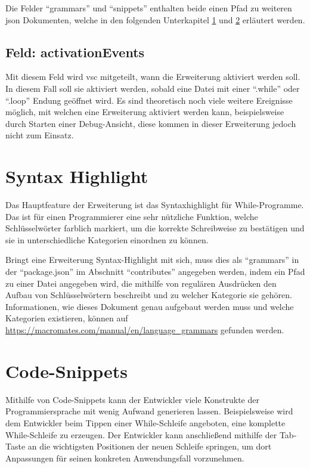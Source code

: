 Die Felder \enquote{grammars} und \enquote{snippets} enthalten beide einen Pfad zu weiteren \ac{json} Dokumenten, welche in den folgenden Unterkapitel \ref{sec:SyntaxHighlight} und \ref{sec:code-snippet} erläutert werden.


\subsection{Feld: activationEvents}
Mit diesem Feld wird \ac{vsc} mitgeteilt, wann die Erweiterung aktiviert werden soll. In diesem Fall soll sie aktiviert werden, sobald eine Datei mit einer \enquote{.while} oder \enquote{.loop} Endung geöffnet wird. Es sind theoretisch noch viele weitere Ereignisse möglich, mit welchen eine Erweiterung aktiviert werden kann, beispielsweise durch Starten einer Debug-Ansicht, diese kommen in dieser Erweiterung jedoch nicht zum Einsatz.

\section{Syntax Highlight}\label{sec:SyntaxHighlight}
Das Hauptfeature der Erweiterung ist das Syntaxhighlight für While-Programme. Das ist für einen Programmierer eine sehr nützliche Funktion, welche Schlüsselwörter farblich markiert, um die korrekte Schreibweise zu bestätigen und sie in unterschiedliche Kategorien einordnen zu können.

Bringt eine Erweiterung Syntax-Highlight mit sich, muss dies als \enquote{grammars} in der \enquote{package.json} im Abschnitt \enquote{contributes} angegeben werden, indem ein Pfad zu einer Datei angegeben wird, die mithilfe von regulären Ausdrücken den Aufbau von Schlüsselwörtern beschreibt und zu welcher Kategorie sie gehören. Informationen, wie dieses Dokument genau aufgebaut werden muss und welche Kategorien existieren, können auf \url{https://macromates.com/manual/en/language_grammars} gefunden werden.

\section{Code-Snippets}\label{sec:code-snippet}
Mithilfe von Code-Snippets kann der Entwickler viele Konstrukte der Programmiersprache mit wenig Aufwand generieren lassen. Beispielsweise wird dem Entwickler beim Tippen einer While-Schleife angeboten, eine komplette While-Schleife zu erzeugen. Der Entwickler kann anschließend mithilfe der Tab-Taste an die wichtigsten Positionen der neuen Schleife springen, um dort Anpassungen für seinen konkreten Anwendungsfall vorzunehmen.

